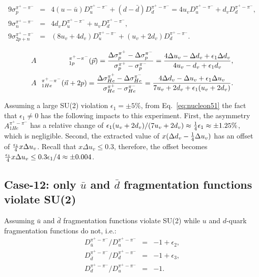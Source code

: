 \begin{eqnarray}  
 9 \sigma_p^{\pi^+ -\pi^-} & = & 4 (u-\bar{u}) D_u^{\pi^+ -\pi^-}
   + (d-\bar{d}) D_d^{\pi^+ -\pi^-} = 4 u_v D_u^{\pi^+ -\pi^-} + d_v D_d^{\pi^+ -\pi^-} , \nonumber \\ 
 9 \sigma_n^{\pi^+ -\pi^-} & = & 4 d_v D_u^{\pi^+ -\pi^-} + u_v D_d^{\pi^+ -\pi^-}, \nonumber \\ 
 9 \sigma_{2p+n}^{\pi^+ -\pi^-} & = & (8u_v + 4 d_v) D_u^{\pi^+ -\pi^-} + (u_v+2d_v) D_d^{\pi^+ -\pi^-}.
\label{eq:nucleon5}  
\end{eqnarray}  

\begin{eqnarray}
\label{eq:cllo}
&A&\hspace{-0.1cm}_{1p}^{\pi^+ - \pi^-}({\vec p})  =  { \Delta \sigma_p^{\pi^+}-\Delta \sigma_p^{\pi^-} \over
\sigma_p^{\pi^+} - \sigma_p^{\pi^-} }=
{  4\Delta u_v - \Delta d_v + \epsilon_1 \Delta d_v
\over 4u_v - d_v + \epsilon_1 d_v}, \\
&A&\hspace{-0.1cm}_{1He}^{\pi^+ - \pi^-} ({\vec n}+2p) =  { \Delta \sigma_{He}^{\pi^+}-\Delta \sigma_{He}^{\pi^-} \over
\sigma_{He}^{\pi^+}- \sigma_{He}^{\pi^-} }=
{ 4\Delta d_v - \Delta u_v + \epsilon_1 \Delta u_v
\over 7 u_v + 2 d_v + \epsilon_1 (u_v + 2 d_v)}. 
\label{eq:nucleon51}  
\end{eqnarray}

 Assuming a large SU(2) violation  $\epsilon_1= \pm 5 \%$, from Eq.~\ref{eq:nucleon51} the fact that $\epsilon_1 \ne 0$ 
has the following impacts to this experiment. First, the asymmetry $A_{1He}^{\pi^+ - \pi^-}$ has a relative change
of $\epsilon_1 (u_v + 2 d_v)/(7 u_v + 2 d_v) \approx {1 \over 4} \epsilon_1 \approx \pm 1.25 \%$, which is negligible. Second, 
the extracted value of $x(\Delta d_v -{1 \over 4} \Delta u_v)$ has an offset of ${\epsilon_1 \over 4}  x \Delta u_v$. Recall that
$ x \Delta u_v \le 0.3$, therefore, the offset becomes ${\epsilon_1 \over 4}  x \Delta u_v \le 0.3 \epsilon_1 /4 \approx  \pm 0.004 $.

\subsection{Case-12: only $\bar{u}$ and $\bar{d}$  fragmentation  functions violate SU(2)}
Assuming $\bar{u}$ and $\bar{d}$ fragmentation functions violate SU(2)
while $u$ and $d$-quark fragmentation functions do not, i.e.:
\begin{eqnarray}  
 D_{\bar u}^{\pi^+ -\pi^-}/D_u^{\pi^+ -\pi^-} & = & -1+ \epsilon_2, \nonumber \\ 
 D_{\bar d}^{\pi^+ -\pi^-}/D_d^{\pi^+ -\pi^-} & = & -1 + \epsilon_3, \nonumber \\ 
 D_{d}^{\pi^+ -\pi^-}/D_u^{\pi^+ -\pi^-} & = & -1.
\label{eq:nucleon6}  
\end{eqnarray}  

